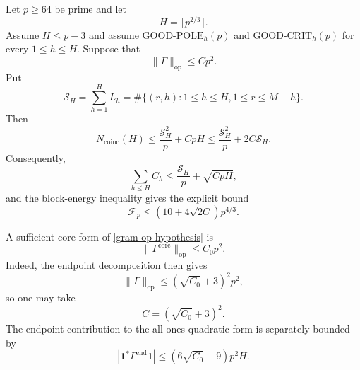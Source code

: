 \begin{proposition}
\label{gram-op-proposition}
Let $p\ge64$ be prime and let
\[
 H=\lceil p^{2/3}\rceil.
\]
Assume $H\le p-3$ and assume
$\mathrm{GOOD\mbox{-}POLE}_h(p)$ and
$\mathrm{GOOD\mbox{-}CRIT}_h(p)$ for every $1\le h\le H$.
Suppose that
\begin{equation}
 \boxed{\|\Gamma\|_{\mathrm{op}}\le Cp^2.}
 \tag{GRAM-OP}
 \label{gram-op-hypothesis}
\end{equation}
Put
\[
 \mathcal S_H=\sum_{h=1}^HL_h=\#\{(r,h):1\le h\le H,
 1\le r\le M-h\}.
\]
Then
\begin{equation}
 N_{\mathrm{coinc}}(H)
 \le\frac{\mathcal S_H^2}{p}+CpH
 \le\frac{\mathcal S_H^2}{p}+2C\mathcal S_H.
 \label{gram-coinc-conclusion}
\end{equation}
Consequently,
\begin{equation}
 \sum_{h\le H}C_h
 \le\frac{\mathcal S_H}{p}+\sqrt{CpH},
 \label{gram-small-gap-conclusion}
\end{equation}
and the block-energy inequality gives the explicit bound
\begin{equation}
 \boxed{\mathcal F_p
 \le(10+4\sqrt{2C})p^{4/3}.}
 \label{gram-energy-conclusion}
\end{equation}

A sufficient core form of \eqref{gram-op-hypothesis} is
\begin{equation}
 \|\Gamma^{\mathrm{core}}\|_{\mathrm{op}}
 \le C_0p^2.
 \label{gram-core-hypothesis}
\end{equation}
Indeed, the endpoint decomposition then gives
\begin{equation}
 \|\Gamma\|_{\mathrm{op}}
 \le(\sqrt{C_0}+3)^2p^2,
 \label{gram-core-to-total}
\end{equation}
so one may take
\[
 C=(\sqrt{C_0}+3)^2.
\]
The endpoint contribution to the all-ones quadratic form is separately
bounded by
\begin{equation}
 \left|\mathbf 1^*\Gamma^{\mathrm{end}}\mathbf 1\right|
 \le(6\sqrt{C_0}+9)p^2H.
 \label{gram-endpoint-ones}
\end{equation}
\end{proposition}

